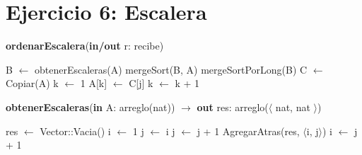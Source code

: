 \section{Ejercicio 6: Escalera}

\begin{algorithm}[H]
\caption{
    \textbf{ordenarEscalera}(\textbf{in/out} r: recibe)
}
    \begin{algorithmic}[1]
        \State B $\gets$ obtenerEscaleras(A) 
        \State mergeSort(B, A) 
        \State mergeSortPorLong(B) 
        \State C $\gets$ Copiar(A)
        \State k $\gets$ 1
                \State A[k] $\gets$ C[j]
                \State k $\gets$ k + 1
            \EndFor
        \EndFor
    \end{algorithmic}
\end{algorithm}

\begin{algorithm}[H]
\caption{
    \textbf{obtenerEscaleras}(\textbf{in} A: arreglo(nat)) $\to$ \textbf{out} res: arreglo($\langle$ nat, nat $\rangle$) 
}
    \begin{algorithmic}[1]
        \State res $\gets$ Vector::Vacia()
        \State i $\gets$ 1
             \State j $\gets$ i
                \State j $\gets$ j + 1
            \EndWhile
                \State AgregarAtras(res, $\langle$i, j$\rangle$)
                \State i $\gets$ j + 1
        \EndWhile
    \end{algorithmic}
\end{algorithm}
